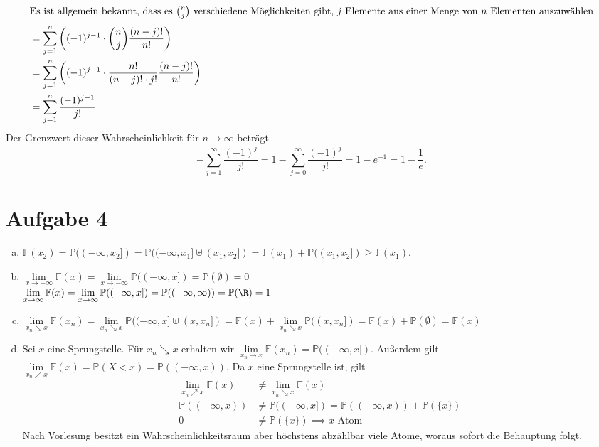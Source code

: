 \documentclass{article}
\newcommand{\IP}{\mathbb{P}}
\newcommand{\F}{\mathbb{F}}
\begin{document}
\begin{enumerate}[(a)]
\begin{align*}
            \intertext{Es ist allgemein bekannt, dass es $\binom{n}{j}$ verschiedene Möglichkeiten gibt, $j$ Elemente aus einer Menge von $n$ Elementen auszuwählen}
            &= \sum_{j = 1}^{n} \left((-1)^{j-1} \cdot \binom{n}{j} \frac{(n-j)!}{n!}\right)\\
            &= \sum_{j = 1}^{n} \left((-1)^{j-1} \cdot \frac{n!}{(n-j)! \cdot j!} \frac{(n-j)!}{n!}\right)\\
            &= \sum_{j = 1}^{n} \frac{(-1)^{j-1}}{j!}
        \end{align*}
        Der Grenzwert dieser Wahrscheinlichkeit für $n\to \infty$ beträgt
        \[
            - \sum_{j = 1}^{\infty} \frac{(-1)^j}{j!} = 1 - \sum_{j = 0}^{\infty} \frac{(-1)^j}{j!} = 1 - e^{-1} = 1 - \frac{1}{e}.
        \]
    \end{enumerate}
    \section*{Aufgabe 4}
    \begin{enumerate}[(a)]
        \item $\F(x_2) = \IP((-\infty, x_2]) = \IP((-\infty, x_1] \uplus (x_1, x_2]) = \F(x_1) + \IP((x_1, x_2]) \geq \F(x_1)$.
        \item $\lim\limits_{x \to -\infty} \F(x) = \lim\limits_{x \to -\infty} \IP((-\infty, x]) = \IP(\emptyset) = 0$\\
            $\lim\limits_{x \to \infty} \F(x) = \lim\limits_{x \to \infty} \IP((-\infty, x]) = \IP((-\infty, \infty)) = \IP(\R) = 1$
        \item $\lim\limits_{x_n \searrow x} \F(x_n) = \lim\limits_{x_n \searrow x} \IP((-\infty, x] \uplus (x, x_n]) = \F(x) + \lim\limits_{x_n \searrow x} \IP((x, x_n]) = \F(x) + \IP(\emptyset) = \F(x)$
        \item Sei $x$ eine Sprungstelle. Für $x_n \searrow x$ erhalten wir $\lim\limits_{x_n \to x} \F(x_n) = \IP((-\infty, x])$. Außerdem gilt $\lim\limits_{x_n \nearrow x} \F(x) = \IP(X < x) = \IP((-\infty, x))$. 
        Da $x$ eine Sprungstelle ist, gilt 
        \begin{align*}
            \lim\limits_{x_n \nearrow x} \F(x) &\neq \lim\limits_{x_n \searrow x} \F(x)\\
            \IP((-\infty, x)) &\neq \IP((-\infty, x]) = \IP((-\infty, x)) + \IP(\{x\})\\
            0 &\neq \IP(\{x\}) \implies x \text{ Atom}
        \end{align*}
        Nach Vorlesung besitzt ein Wahrscheinlichkeitsraum aber höchstens abzählbar viele Atome, woraus sofort die Behauptung folgt. 
    \end{enumerate}
\end{document}
